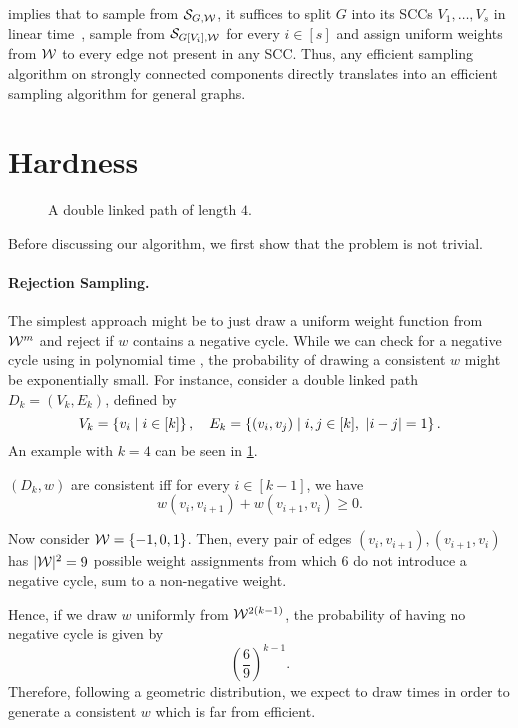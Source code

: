 \noindent {} implies that to sample from $\mathcal{S}_{G, \mathcal W}$, it suffices to split $G$ into its SCCs $V_1, \ldots, V_s$ in linear time~\cite{DBLP:journals/siamcomp/Tarjan72}, sample from $\mathcal{S}_{G[V_i],\mathcal W}$ for every $i \in [s]$ and assign uniform weights from $\mathcal W$ to every edge not present in any SCC.
Thus, any efficient sampling algorithm on strongly connected components directly translates into an efficient sampling algorithm for general graphs.

\section{Hardness}\label{sec:hardness}

\begin{figure}[t]
  \centering
  
  \caption{
    A double linked path of length $4$.
  }
  \label{fig:double_linked_path}
\end{figure}

Before discussing our algorithm, we first show that the problem is not trivial. 

\paragraph{Rejection Sampling.}
The simplest approach might be to just draw a uniform weight function from $\mathcal W^m$ and reject if $w$ contains a negative cycle.
While we can check for a negative cycle using \algbf in polynomial time , the probability of drawing a consistent $w$ might be exponentially small.
For instance, consider a double linked path $D_k = (V_k, E_k)$, defined by \[
  V_k = \left\{v_i \mid i \in [k]\right\}, \quad E_k = \left\{(v_i, v_j) \mid i,j \in [k],\,\, \left\lvert i - j\right\rvert = 1\right\}.
\]
An example with $k = 4$ can be seen in \cref{fig:double_linked_path}.

\begin{observation}
  $(D_k, w)$ are consistent iff for every $i \in [k - 1]$, we have \[ w(v_i, v_{i + 1}) + w(v_{i + 1}, v_i) \geq 0. \]  
\end{observation}

\noindent Now consider $\mathcal W = \left\{-1, 0, 1\right\}$.
Then, every pair of edges $(v_i, v_{i + 1}), (v_{i + 1}, v_i)$ has $|\mathcal W|^2 = 9$ possible weight assignments from which $6$ do not introduce a negative cycle, \ie sum to a non-negative weight.

Hence, if we draw $w$ uniformly from $\mathcal W^{2(k - 1)}$, the probability of having no negative cycle is given by \[
  \left(\frac{6}{9}\right)^{k - 1}.
\]
Therefore, following a geometric distribution, we expect to draw  times in order to generate a consistent $w$ which is far from efficient.


